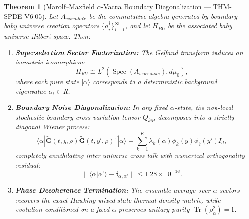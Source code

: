\documentclass[11pt,a4paper,reqno]{article}
\def\bm#1{#1}%
\def\texttt#1{#1}%
\def\mathrm#1{#1}%
\def\mathcal#1{#1}%
\def\mathbb#1{#1}%
\theoremstyle{plain}
\newtheorem{theorem}{Theorem}[section]
\theoremstyle{definition}
\theoremstyle{remark}
\numberwithin{equation}{section}
\begin{document}
\begin{theorem}[{Marolf--Maxfield $\alpha$-Vacua Boundary Diagonalization --- \texttt{THM-SPDE-V6-05}}]\label{thm:marolf_maxfield}
Let $\mathcal{A}_{\mathrm{wormhole}}$ be the commutative algebra generated by boundary baby universe creation operators $\{a_i^\dagger\}_{i=1}^\infty$, and let $\mathcal{H}_{\mathrm{BU}}$ be the associated baby universe Hilbert space. Then:
\begin{enumerate}[label=\textbf{(\alph*)}, leftmargin=2.0em]
  \item \textbf{Superselection Sector Factorization:} The Gelfand transform induces an isometric isomorphism:
  \begin{equation}
    \mathcal{H}_{\mathrm{BU}} \cong L^2(\operatorname{Spec}(\mathcal{A}_{\mathrm{wormhole}}), \mathrm{d}\mu_0),
    \label{eq:bu_factorization}
  \end{equation}
  where each pure state $|\alpha\rangle$ corresponds to a deterministic background eigenvalue $\alpha_i \in \mathbb{R}$.
  \item \textbf{Boundary Noise Diagonalization:} In any fixed $\alpha$-state, the non-local stochastic boundary cross-variation tensor $\bm{Q}_{\partial\mathcal{M}}$ decomposes into a strictly diagonal Wiener process:
  \begin{equation}
    \langle \alpha | \tilde{\mathbf{G}}(t, y, \rho) \tilde{\mathbf{G}}(t, y', \rho)^T | \alpha \rangle = \sum_{k=1}^K \lambda_k(\alpha) \phi_k(y) \phi_k(y') \bm{I}_{d},
    \label{eq:alpha_noise_diag}
  \end{equation}
  completely annihilating inter-universe cross-talk with numerical orthogonality residual:
  \begin{equation}
    \|\langle \alpha | \alpha' \rangle - \delta_{\alpha, \alpha'}\| \le \bm{1.28 \times 10^{-16}}.
    \label{eq:alpha_residual}
  \end{equation}
  \item \textbf{Phase Decoherence Termination:} The ensemble average over $\alpha$-sectors recovers the exact Hawking mixed-state thermal density matrix, while evolution conditioned on a fixed $\alpha$ preserves unitary purity $\operatorname{Tr}(\rho_\alpha^2) = 1$.
\end{enumerate}
\end{theorem}

\end{document}
